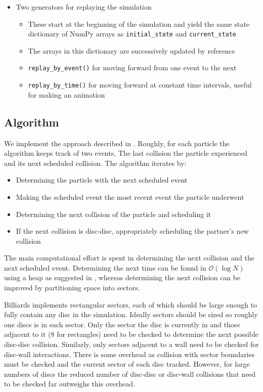 \documentclass{article}
\begin{document}
\begin{itemize}
\begin{itemize}
        \item Two generators for replaying the simulation
        \begin{itemize}
            \item These start at the beginning of the simulation and yield the same state dictionary of NumPy arrays as \texttt{initial\_state} and \texttt{current\_state}
            \item The arrays in this dictionary are successively updated by reference
            \item \texttt{replay\_by\_event()} for moving forward from one event to the next
            \item \texttt{replay\_by\_time()} for moving forward at constant time intervals, useful for making an animation
        \end{itemize}
    \end{itemize}
\end{itemize}

\subsection{Algorithm}
We implement the approach described in \cite{Lubachevsky-1991}. Roughly, for each particle the algorithm keeps track of two events, The last collision the particle experienced and its next scheduled collision. The algorithm iterates by:
\begin{itemize}
    \item Determining the particle with the next scheduled event
    \item Making the scheduled event the most recent event the particle underwent 
    \item Determining the next collision of the particle and scheduling it
    \item If the next collision is disc-disc, appropriately scheduling the partner's new collision
\end{itemize}
The main computational effort is spent in determining the next collision and the next scheduled event. Determining the next time can be found in $\mathcal{O}(\log N)$ using a heap as suggested in \cite{Lubachevsky-1991}, whereas determining the next collision can be improved by partitioning space into sectors.

Billiards implements rectangular sectors, each of which should be large enough to fully contain any disc in the simulation. Ideally sectors should be sized so roughly one discs is in each sector. Only the sector the disc is currently in and those adjacent to it (8 for rectangles) need to be checked to determine the next possible disc-disc collision. Similarly, only sectors adjacent to a wall need to be checked for disc-wall interactions. There is some overhead as collision with sector boundaries must be checked and the current sector of each disc tracked. However, for large numbers of discs the reduced number of disc-disc or disc-wall collisions that need to be checked far outweighs this overhead.



\end{document}
